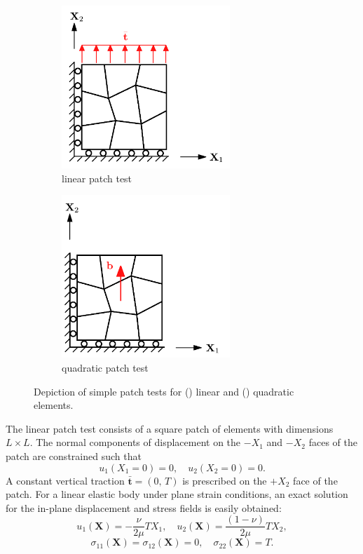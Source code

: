 \begin{figure}[!h]
    \centering
    \begin{subfigure}[b]{0.49\linewidth}
            \centering
            \includegraphics[width=2.5in]{figures/linear_patch_test.pdf}
    			\caption{linear patch test \label{fig:linear_patch_test}}
    \end{subfigure}
	\begin{subfigure}[b]{0.49\linewidth}
            \centering
            \includegraphics[width=2.5in]{figures/quadratic_patch_test.pdf}
    			\caption{quadratic patch test \label{fig:quadratic_patch_test}}
    \end{subfigure}
    \caption{Depiction of simple patch tests for () linear and () quadratic elements.}
    \label{fig:polygonal_patches}
\end{figure}

The linear patch test consists of a square patch of elements with dimensions $L \times L$. The normal components of displacement on the $-X_1$ and $-X_2$ faces of the patch are constrained such that
\begin{equation}
	u_1 (X_1 = 0) = 0, \quad u_2 (X_2 = 0) = 0.
\end{equation}
A constant vertical traction $\bar{\mathbf{t}} = (0, \, T)$ is prescribed on the $+X_2$ face of the patch. For a linear elastic body under plane strain conditions, an exact solution for the in-plane displacement and stress fields is easily obtained:
\begin{equation}
	u_1 (\mathbf{X}) = - \frac{\nu}{2 \mu} T X_1, \quad u_2 (\mathbf{X}) = \frac{(1-\nu)}{2 \mu} T X_2,
\end{equation}
\begin{equation}
	\sigma_{11} (\mathbf{X}) = \sigma_{12} (\mathbf{X}) = 0, \quad \sigma_{22} (\mathbf{X}) = T.
\end{equation}

